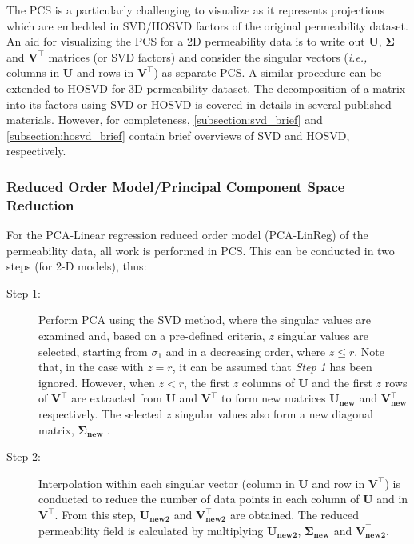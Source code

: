 \documentclass[preprint,12pt]{elsarticle}
\newcommand{\ie}{{\it i.e., }}
\begin{document}
The PCS is a particularly challenging to visualize as it represents projections which are embedded in SVD/HOSVD factors of the original permeability dataset. An aid for visualizing the PCS for a 2D permeability data is to write out $\mathbf{U}$, $\mathbf{\Sigma}$ and $\mathbf{V^{\intercal}}$ matrices (or SVD factors) and consider the singular vectors (\ie columns in $\mathbf{U}$ and rows in $\mathbf{V^{\intercal}}$) as separate PCS. A similar procedure can be extended to HOSVD for 3D permeability dataset. The decomposition of a matrix into its factors using SVD \cite{Cline_2007, Tharwat_2016} or HOSVD \cite{Kolda_2009, Lathauwer_2000} is covered in details in several published materials. However, for completeness, \ref{subsection:svd_brief} and \ref{subsection:hosvd_brief} contain brief overviews of SVD and HOSVD, respectively.

\subsubsection{Reduced Order Model/Principal Component Space Reduction}\label{subsubsection:pca_dimred_linreg}
For the PCA-Linear regression reduced order model (PCA-LinReg) of the permeability data, all work is performed in PCS. This can be conducted in two steps (for 2-D models), thus:
\begin{description}
  \item[Step 1:] Perform PCA \cite{Hotelling_1933, Tharwat_2016} using the SVD method, where the singular values are examined and, based on a pre-defined criteria, $z$ singular values are selected, starting from $\sigma_{1}$ and in a decreasing order, where $z \leq r$. Note that, in the case with $z = r$, it can be assumed that {\it Step 1} has been ignored. However, when $z < r$, the first $z$ columns of $\mathbf{U}$ and the first $z$ rows of $\mathbf{V^{\intercal}}$ are extracted from $\mathbf{U}$ and $\mathbf{V^{\intercal}}$ to form new matrices $\mathbf{U_{new}}$ and $\mathbf{V^{\intercal}_{new}}$ respectively. The selected $z$ singular values also form a new diagonal matrix, $\mathbf{\Sigma_{new}}$ .

  \item[Step 2:] Interpolation within each singular vector (column in $\mathbf{U}$ and row in $\mathbf{V^{\intercal}}$) is conducted to reduce the number of data points in each column of $\mathbf{U}$ and in $\mathbf{V^{\intercal}}$. From this step,  $\mathbf{U_{new2}}$ and $\mathbf{V^{\intercal}_{new2}}$ are obtained. The reduced permeability field is calculated by multiplying  $\mathbf{U_{new2}}$, $\mathbf{\Sigma_{new}}$ and $\mathbf{V^{\intercal}_{new2}}$.

\end{description}
\end{document}
